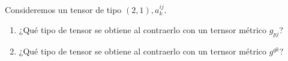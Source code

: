 \item Consideremos un tensor de tipo $(2,1),a_k^{ij}$.
    \begin{enumerate}
        \item ¿Qué tipo de tensor se obtiene al contraerlo con un ternsor métrico $g_{pj}$?
            \begin{mdframed}[style=s]
                
            \end{mdframed}
        \item ¿Qué tipo de tensor se obtiene al contraerlo con un ternsor métrico $g^{qk}$?
            \begin{mdframed}[style=s]
                
            \end{mdframed}
    \end{enumerate}